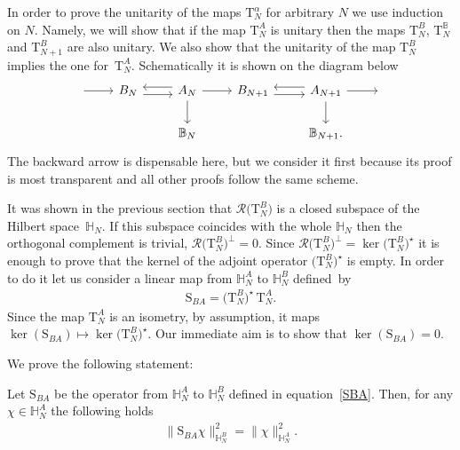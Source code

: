 In order to prove the unitarity of the maps $\mathrm T^\alpha_N$ for arbitrary $N$ we use induction on $N$. Namely, we will show
that if the map $\mathrm T_N^{A}$ is unitary %
then the maps $\mathrm T_N^B$, $\mathrm T_N^{\mathbb B}$ and $\mathrm T_{N+1}^B$ are also unitary. We also show that the unitarity of the
map $\mathrm T_{N}^B$ implies the one for~$\mathrm T_{N}^A$. Schematically it is shown on the diagram below
\begin{equation*}%
\begin{tikzcd}
\arrow[r] &B_N\arrow[r, yshift=-0.7ex]
&\arrow[l, yshift=0.7ex] A_N \arrow[r] \arrow[d] & B_{N+1}\arrow[r, yshift=-0.7ex] &
\arrow[l, yshift=0.7ex] A_{N+1} \arrow[d] \arrow[r] &{}
\\
&&\mathbb{B}_N && \mathbb{B}_{N+1}.
\end{tikzcd}
\end{equation*}
The backward arrow is dispensable here, but we consider it first because its proof is most transparent and all other proofs follow the same
scheme.

{\sloppy
It was shown in
the previous section that $\mathcal R\big(\mathrm T_N^B\big)$
is a closed subspace of the Hilbert space~$\mathbb H_N$. If this subspace coincides with the whole $\mathbb H_N$ then the orthogonal
complement is trivial, $\mathcal R\big(\mathrm T_N^B \big)^\perp=0$. Since $\mathcal R\big(\mathrm T_N^B \big)^\perp=\ker \big(\mathrm T_N^B\big)^\star$ it is
enough to prove that the kernel of the adjoint operator $\big(\mathrm T_N^B\big)^\star$ is empty. In order to do it let us consider a linear map
from $\mathbb H_N^A$ to $\mathbb H_N^B$ defined~by
\begin{gather}\label{SBA}
\mathrm S_{BA}=\big(\mathrm T_N^B\big)^\star\,\mathrm T_N^A.
\end{gather}
Since the map $\mathrm T_N^A$ is an isometry, by assumption, it maps $ \ker(\mathrm S_{BA})\mapsto \ker \big(\mathrm T_N^B\big)^\star$. Our
immediate aim is to show that $ \ker(\mathrm S_{BA})=0$.}

We prove the following statement:

\begin{Lemma}\label{lemma:SBA}
Let $\mathrm S_{BA}$ be the operator from $\mathbb H_{N}^A$ to $\mathbb H_N^B$ defined in equation~\eqref{SBA}. Then, for any $\chi\in \mathbb
H_{N}^A$ the following holds
\begin{gather}\label{id-SBA}
\|\mathrm S_{BA}\chi\|^2_{\mathbb H_N^B}=\|\chi\|^2_{\mathbb H_N^A}.
\end{gather}
\end{Lemma}
%

